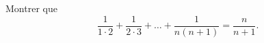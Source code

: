 

\begin{exercice}\label{exoSerieUn0017}

	Montrer que 
	\begin{equation}
		\frac{1}{ 1\cdot 2 }+\frac{1}{ 2\cdot 3 }+\ldots+\frac{1}{ n(n+1) }=\frac{ n }{ n+1 }.
	\end{equation}
	

\end{exercice}
